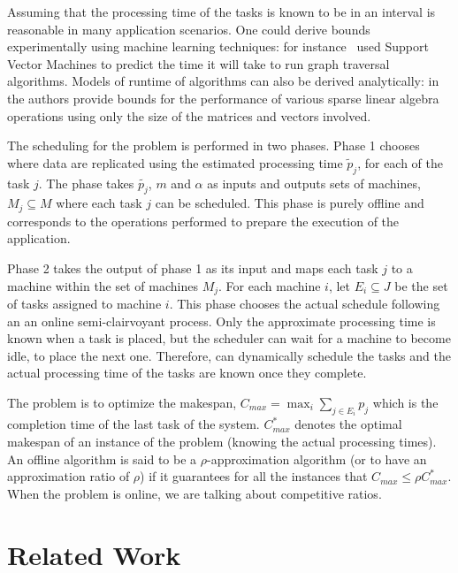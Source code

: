 \documentclass[10pt, conference, compsocconf]{IEEEtran}
\begin{document}
Assuming that the processing time of the tasks is known to be in an
interval is reasonable in many application scenarios. One could derive
bounds experimentally using machine learning techniques: for
instance~\cite{You14-ICPP} used Support Vector Machines to predict the time it
will take to run graph traversal algorithms. Models of runtime of
algorithms can also be derived analytically:
in~\cite{Erlebacher14-ICS} the authors provide bounds for the
performance of various sparse linear algebra operations using only the
size of the matrices and vectors involved.


The scheduling for the problem is performed in two phases. Phase 1
chooses where data are replicated using the estimated processing time
$\tilde p_j $, for each of the task $j$. The phase takes
$\tilde{p_j}$, $m$ and $\alpha$ as inputs and outputs sets of machines,
$M_j \subseteq M $ where each task $j$ can be scheduled. This phase is
purely offline and corresponds to the operations performed to prepare
the execution of the application.

Phase 2 takes the output of phase 1 as its input and maps each task $j$
to a machine within the set of machines $M_j$. For each machine $i$,
let $E_i \subseteq J$ be the set of tasks assigned to machine
$i$. This phase chooses the actual schedule following an an online
semi-clairvoyant process. Only the approximate processing time is
known when a task is placed, but the scheduler can wait for a machine
to become idle, to place the next one. Therefore, can dynamically
schedule the tasks and the actual processing time of the tasks are
known once they complete.

The problem is to optimize the makespan, $C_{max} = \max_i \sum_{j \in
  E_i} p_j$ which is the completion time of the last task of the
system. $C_{max}^{*}$ denotes the optimal makespan of an instance of
the problem (knowing the actual processing times). An offline algorithm is
said to be a $\rho$-approximation algorithm (or to have an
approximation ratio of $\rho$) if it guarantees for all the instances
that $C_{max} \leq \rho C_{max}^*$. When the problem is online, we are
talking about competitive ratios.

\section{Related Work}\label{sec3}
\end{document}
